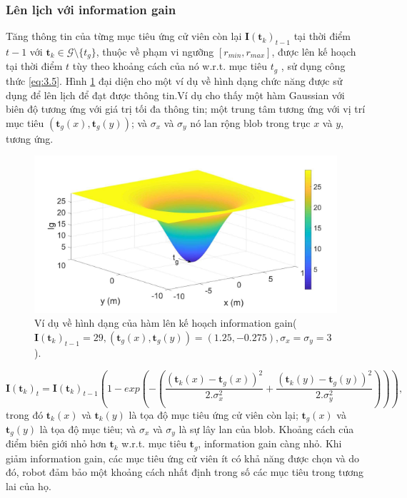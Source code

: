 \documentclass[11pt,openany]{book}
\begin{document}
\subsubsection{Lên lịch với information gain}
Tăng thông tin của từng mục tiêu ứng cử viên còn lại $\mathbf{I}(\mathbf{t}_k)_{t-1}$ tại thời điểm $t-1$ với $\mathbf{t}_k \in \mathcal{G} \setminus \{t_g\}$, thuộc về phạm vi ngưỡng $[r_{min} , r_{max} ]$, được lên kế hoạch tại thời điểm $ t $ tùy theo khoảng cách của nó w.r.t. mục tiêu $t_g$ , sử dụng công thức \ref{eq:3.5}. Hình \ref{fig:3.9} đại diện cho một ví dụ về hình dạng chức năng được sử dụng để lên lịch để đạt được thông tin.Ví dụ cho thấy một hàm Gaussian với biên độ tương ứng với giá trị tối đa thông tin; một trung tâm tương ứng với vị trí mục tiêu $(\mathbf{t}_g(x), \mathbf{t}_g(y))$; và $\sigma_x$ và $\sigma_y$ nó lan rộng blob trong trục $x$ và $y$, tương ứng.
\begin{figure}[H]
    \centering
    \includegraphics[scale=0.6]{assets/3_9.png}
    \caption{Ví dụ về hình dạng của hàm lên kế hoạch information gain($\mathbf{I}(\mathbf{t}_k)_{t-1}=29,(\mathbf{t}_g(x),\mathbf{t}_g(y))=(1.25,-0.275), \sigma_x=\sigma_y=3$).}
    \label{fig:3.9}
\end{figure}
\begin{equation}\label{eq:3.5}
    \mathbf{I}(\mathbf{t}_k)_t=\mathbf{I}(\mathbf{t}_k)_{t-1}(1-exp(-(\frac{(\mathbf{t}_k(x)-\mathbf{t}_g(x))^2}{2.\sigma_x^2}+\frac{(\mathbf{t}_k(y)-\mathbf{t}_g(y))^2}{2.\sigma_y^2}))),
\end{equation}
trong đó $\mathbf{t}_k(x)$ và $\mathbf{t}_k(y)$ là tọa độ mục tiêu ứng cử viên còn lại; $\mathbf{t}_g(x)$ và $\mathbf{t}_g(y)$ là tọa độ mục tiêu; và $\sigma_x$ và $\sigma_y$ là sự lây lan của blob. Khoảng cách của điểm biên giới nhỏ hơn $\mathbf{t}_k$ w.r.t. mục tiêu $\mathbf{t}_g$, information gain càng nhỏ. Khi giảm information gain, các mục tiêu ứng cử viên ít có khả năng được chọn và do đó, robot đảm bảo một khoảng cách nhất định trong số các mục tiêu trong tương lai của họ.
\end{document}
